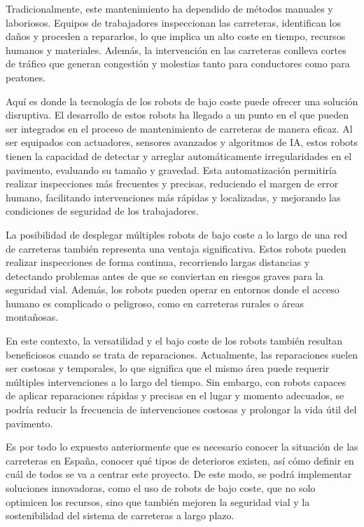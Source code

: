 Tradicionalmente, este mantenimiento ha dependido de métodos manuales y laboriosos. Equipos de trabajadores inspeccionan las carreteras, identifican los daños y proceden a repararlos, lo que implica un alto coste en tiempo, recursos humanos y materiales. Además, la intervención en las carreteras conlleva cortes de tráfico que generan congestión y molestias tanto para conductores como para peatones.

Aquí es donde la tecnología de los robots de bajo coste puede ofrecer una solución disruptiva. El desarrollo de estos robots ha llegado a un punto en el que pueden ser integrados en el proceso de mantenimiento de carreteras de manera eficaz. Al ser equipados con actuadores, sensores avanzados y algoritmos de \ac{IA}, estos robots tienen la capacidad de detectar y arreglar automáticamente irregularidades en el pavimento, evaluando su tamaño y gravedad. Esta automatización permitiría realizar inspecciones más frecuentes y precisas, reduciendo el margen de error humano, facilitando intervenciones más rápidas y localizadas, y mejorando las condiciones de seguridad de los trabajadores.

La posibilidad de desplegar múltiples robots de bajo coste a lo largo de una red de carreteras también representa una ventaja significativa. Estos robots pueden realizar inspecciones de forma continua, recorriendo largas distancias y detectando problemas antes de que se conviertan en riesgos graves para la seguridad vial. Además, los robots pueden operar en entornos donde el acceso humano es complicado o peligroso, como en carreteras rurales o áreas montañosas.

En este contexto, la versatilidad y el bajo coste de los robots también resultan beneficiosos cuando se trata de reparaciones. Actualmente, las reparaciones suelen ser costosas y temporales, lo que significa que el mismo área puede requerir múltiples intervenciones a lo largo del tiempo. Sin embargo, con robots capaces de aplicar reparaciones rápidas y precisas en el lugar y momento adecuados, se podría reducir la frecuencia de intervenciones costosas y prolongar la vida útil del pavimento. 

Es por todo lo expuesto anteriormente que es necesario conocer la situación de las carreteras en España, conocer qué tipos de deterioros existen, así cómo definir en cuál de todos se va a centrar este proyecto. De este modo, se podrá implementar soluciones innovadoras, como el uso de robots de bajo coste, que no solo optimicen los recursos, sino que también mejoren la seguridad vial y la sostenibilidad del sistema de carreteras a largo plazo.


